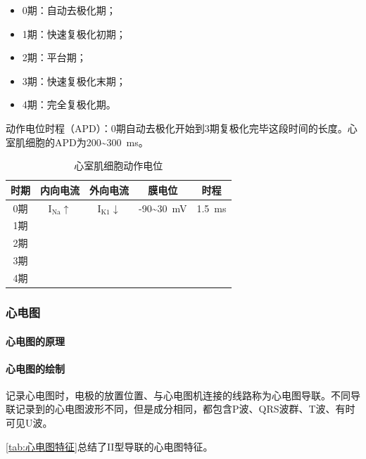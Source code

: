 \begin{itemize}
	\item 0期：自动去极化期；
	\item 1期：快速复极化初期；
	\item 2期：平台期；
	\item 3期：快速复极化末期；
	\item 4期：完全复极化期。
\end{itemize}

动作电位时程（APD）：0期自动去极化开始到3期复极化完毕这段时间的长度。心室肌细胞的APD为200\textasciitilde\SI{300}{\ms}。

\begin{table}[htbp]
	\centering
	\begin{tabularx}{\textwidth}{|c|C|C|c|c|}
		\hline
		时期 & 内向电流 & 外向电流 & 膜电位 & 时程 \\ \hline
		0期 & I$_{\text{Na}}$$\uparrow$ & I$_{\text{K1}}$$\downarrow$ & -90\textasciitilde\SI{+30}{\mV} & \SI{1.5}{\ms} \\ \hline
		1期 &  &  &  &  \\ \hline
		2期 &  &  &  &  \\ \hline
		3期 &  &  &  &  \\ \hline
		4期 &  &  &  &  \\ \hline
	\end{tabularx}
	\caption{心室肌细胞动作电位}
	\label{tab:心室肌细胞动作电位}
\end{table}

\subsubsection{心电图}

\paragraph{心电图的原理}

\paragraph{心电图的绘制}

记录心电图时，电极的放置位置、与心电图机连接的线路称为心电图导联。不同导联记录到的心电图波形不同，但是成分相同，都包含P波、QRS波群、T波、有时可见U波。

\autoref{tab:心电图特征}总结了II型导联的心电图特征。

